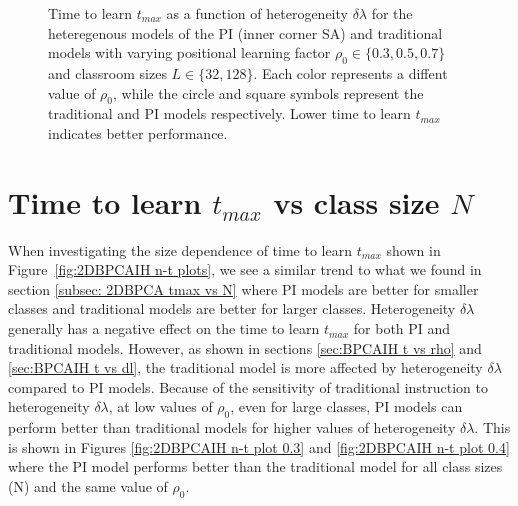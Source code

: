 \begin{figure}[htbp!]
   \centering
   \caption{Time to learn $t_{max}$ as a function of heterogeneity $\delta\lambda$ for the heteregenous models of the PI (inner corner SA) and traditional models with varying positional learning factor $\rho_0\in\lbrace 0.3,0.5,0.7 \rbrace$ and classroom sizes $L\in\lbrace32,128\rbrace$. 
   Each color represents a diffent value of $\rho_0$, while the circle and square symbols represent the traditional and PI models respectively.
   Lower time to learn $t_{max}$ indicates better performance.
   }
   \label{fig:2DBPCAIH dl-t plots}
\end{figure}

\newpage %

\section{Time to learn $t_{max}$ vs class size $N$}\label{sec:BPCAIH m vs dl}

When investigating the size dependence of time to learn $t_{max}$ shown in Figure~\ref{fig:2DBPCAIH n-t plots}, we see a similar trend to what we found in section \ref{subsec: 2DBPCA tmax vs N} where PI models are better for smaller classes and traditional models are better for larger classes.
Heterogeneity $\delta\lambda$ generally has a negative effect on the time to learn $t_{max}$ for both PI and traditional models.
However, as shown in sections \ref{sec:BPCAIH t vs rho} and \ref{sec:BPCAIH t vs dl}, the traditional model is more affected by heterogeneity $\delta\lambda$ compared to PI models.
Because of the sensitivity of traditional instruction to heterogeneity $\delta\lambda$, at low values of $\rho_0$, even for large classes, PI models can perform better than traditional models for higher values of heterogeneity $\delta\lambda$.
This is shown in Figures \ref{fig:2DBPCAIH n-t plot 0.3} and \ref{fig:2DBPCAIH n-t plot 0.4} where the PI model performs better than the traditional model for all class sizes (N) and the same value of $\rho_0$.

